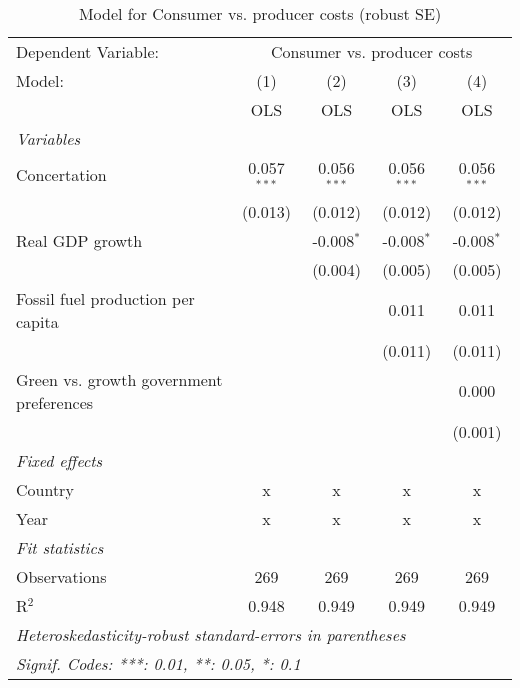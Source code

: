 
\begin{table}[htbp]
   \caption{Model for Consumer vs. producer costs (robust SE)}
   \centering
   \begin{tabular}{lcccc}
      \toprule
      Dependent Variable: & \multicolumn{4}{c}{Consumer vs. producer costs}\\
      Model:                                  & (1)           & (2)           & (3)           & (4)\\  
                                              &  OLS          & OLS           & OLS           & OLS\\  
      \midrule
      \emph{Variables}\\
      Concertation                            & 0.057$^{***}$ & 0.056$^{***}$ & 0.056$^{***}$ & 0.056$^{***}$\\   
                                              & (0.013)       & (0.012)       & (0.012)       & (0.012)\\   
      Real GDP growth                         &               & -0.008$^{*}$  & -0.008$^{*}$  & -0.008$^{*}$\\   
                                              &               & (0.004)       & (0.005)       & (0.005)\\   
      Fossil fuel production per capita       &               &               & 0.011         & 0.011\\   
                                              &               &               & (0.011)       & (0.011)\\   
      Green vs. growth government preferences &               &               &               & 0.000\\   
                                              &               &               &               & (0.001)\\   
      \emph{Fixed effects}\\
      Country                                 & x             & x             & x             & x\\  
      Year                                    & x             & x             & x             & x\\  
      \midrule \emph{Fit statistics}\\
      Observations                            & 269           & 269           & 269           & 269\\  
      R$^2$                                   & 0.948         & 0.949         & 0.949         & 0.949\\  
      \midrule
      \multicolumn{5}{l}{\emph{Heteroskedasticity-robust standard-errors in parentheses}}\\
      \multicolumn{5}{l}{\emph{Signif. Codes: ***: 0.01, **: 0.05, *: 0.1}}\\
   \end{tabular}
\end{table}


